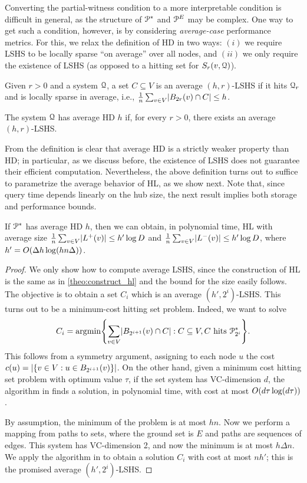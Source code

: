 Converting the partial-witness condition to a more interpretable condition is difficult in general, as the structure of $\mathcal{P}^*$ and $\mathcal{P}^E$ may be complex. 
One way to get such a condition, however, is by considering \emph{average-case} performance metrics.
For this, we relax the definition of HD in two ways: $(i)$ we require LSHS to be locally sparse ``on average'' over all nodes, and
$(ii)$ we only require the existence of LSHS (as opposed to a hitting set for $S_r(v,\mathcal{Q})$).

\begin{definition}
Given $r>0$ and a system $\mathcal{Q}$, a set $C\subseteq V$ is an average $(h,r)$-LSHS if it hits $\mathcal{Q}_r$ and is locally sparse in average, i.e.,
$\frac{1}{n}\sum_{v\in V} \lvert B_{2r}(v)\cap C\rvert \leq h$.
\end{definition}
\begin{definition}[Average HD]
The system $\mathcal{Q}$ has average HD $h$ if, for every $r>0$, there exists an average $(h,r)$-LSHS.
\end{definition}

From the definition is clear that average HD is a strictly weaker property than HD; in particular, as we discuss before, the existence of LSHS does not guarantee their efficient computation.
Nevertheless, the above definition turns out to suffice to parametrize the average behavior of HL, as we show next.
Note that, since query time depends linearly on the hub size, the next result implies both storage and performance bounds.
\begin{theorem}\label{theo:preproc_avg}
If $\mathcal{P}^*$ has average HD $h$, then we can obtain, in polynomial time, HL with average size 
$\frac{1}{n}\sum_{v\in V} \lvert L^+(v)\rvert \leq h'\log D$ and 
$\frac{1}{n}\sum_{v\in V} \lvert L^-(v)\rvert \leq h'\log D$,
where $h'=O(\Delta h\log (hn\Delta))$.
\end{theorem}
\begin{proof}
We only show how to compute average LSHS, since the construction of HL is the same as in \cref{theo:construct_hl} and the bound for the size easily follows. 
The objective is to obtain a set $C_i$ which is an average $(h',2^i)$-LSHS.
This turns out to be a minimum-cost hitting set problem.
Indeed, we want to solve
\[
C_i = \arg\!\min\crl*{\sum_{v\in V}\abs{B_{2^{i+1}}(v)\cap C}: C\subseteq V, C \text{ hits } \PS_{2^i}}.
\]
This follows from a symmetry argument, assigning to each node $u$ the cost $c(u)=\lvert\{v\in V: u\in B_{2^{i+1}}(v)\}\rvert$.
On the other hand, given a minimum cost hitting set problem with optimum value $\tau$, if the set system has VC-dimension $d$, the algorithm in \citep{vc_dim_hitting} finds a solution, in polynomial time, with cost at most $O(d\tau\log(d\tau))$.

By assumption, the minimum of the problem is at most $hn$.
Now we perform a mapping from paths to sets, where the ground set is $E$ and paths are sequences of edges.
This system has VC-dimension 2, and now the minimum is at most $h\Delta n$.
We apply the algorithm in \citep{vc_dim_hitting} to obtain a solution $C_i$ with cost at most $nh'$; this is the promised average $(h',2^i)$-LSHS.
\end{proof}
